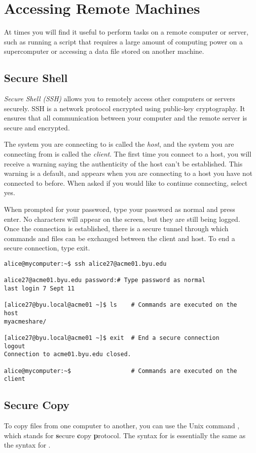\section*{Accessing Remote Machines} %
At times you will find it useful to perform tasks on a remote computer or server, such as running a script that requires a large amount of computing power on a supercomputer or accessing a data file stored on another machine.

\subsection*{Secure Shell}
\emph{Secure Shell (SSH)} allows you to remotely access other computers or servers securely.
SSH is a network protocol encrypted using public-key cryptography.
It ensures that all communication between your computer and the remote server is secure and encrypted.

The system you are connecting to is called the \emph{host}, and the system you are connecting from is called the \emph{client}.
The first time you connect to a host, you will receive a warning saying the authenticity of the host can't be established.
This warning is a default, and appears when you are connecting to a host you have not connected to before.
When asked if you would like to continue connecting, select yes.

When prompted for your password, type your password as normal and press enter.
No characters will appear on the screen, but they are still being logged.
Once the connection is established, there is a secure tunnel through which commands and files can be exchanged between the client and host.
To end a secure connection, type exit.

\begin{lstlisting}
alice@mycomputer:~$ ssh alice27@acme01.byu.edu

alice27@acme01.byu.edu password:# Type password as normal
last login 7 Sept 11

[alice27@byu.local@acme01 ~]$ ls	# Commands are executed on the host
myacmeshare/

[alice27@byu.local@acme01 ~]$ exit	# End a secure connection
logout
Connection to acme01.byu.edu closed.

alice@mycomputer:~$					# Commands are executed on the client
\end{lstlisting}

\subsection*{Secure Copy} %
To copy files from one computer to another, you can use the Unix command , which stands for \textbf{s}ecure \textbf{c}opy \textbf{p}rotocol.
The syntax for  is essentially the same as the syntax for .

